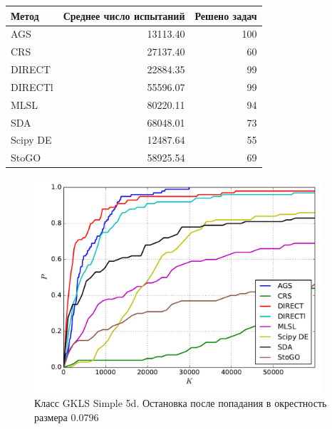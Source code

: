 \documentclass[a4paper]{article}
\begin{document}
\begin{tabular}{lrr}
\hline
 Метод    &   Среднее число испытаний &   Решено задач \\
\hline
 AGS      &                  13113.40 &            100 \\
 CRS      &                  27137.40 &             60 \\
 DIRECT   &                  22884.35 &             99 \\
 DIRECTl  &                  55596.07 &             99 \\
 MLSL     &                  80220.11 &             94 \\
 SDA      &                  68048.01 &             73 \\
 Scipy DE &                  12487.64 &             55 \\
 StoGO    &                  58925.54 &             69 \\
\hline
\end{tabular}
\begin{figure}[H]
  \center
  \includegraphics[width=0.95\textwidth]{../experiments/gklss5d_serg/cmc.pdf}
  \caption{Класс GKLS Simple 5d. Остановка после попадания в окрестность размера $0.0796$}
  \label{fig:}
\end{figure}
\end{document}
